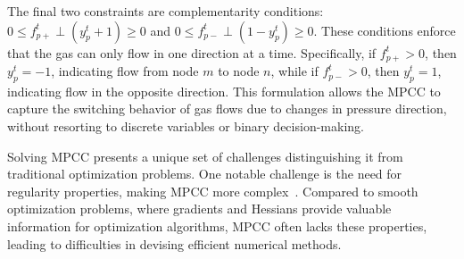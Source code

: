The final two constraints are complementarity conditions: $0 \leq f_{p+}^t \perp (y_p^t + 1) \geq 0$ and $0 \leq f_{p-}^t \perp (1 - y_p^t) \geq 0$. These conditions enforce that the gas can only flow in one direction at a time. Specifically, if $f_{p+}^t > 0$, then $y_p^t = -1$, indicating flow from node $m$ to node $n$, while if $f_{p-}^t > 0$, then $y_p^t = 1$, indicating flow in the opposite direction. This formulation allows the MPCC to capture the switching behavior of gas flows due to changes in pressure direction, without resorting to discrete variables or binary decision-making.

Solving MPCC presents a unique set of challenges distinguishing it from traditional optimization problems. One notable challenge is the need for regularity properties, making MPCC more complex~\citep{MPCC_lack_properties}. Compared to smooth optimization problems, where gradients and Hessians provide valuable information for optimization algorithms, MPCC often lacks these properties, leading to difficulties in devising efficient numerical methods.

